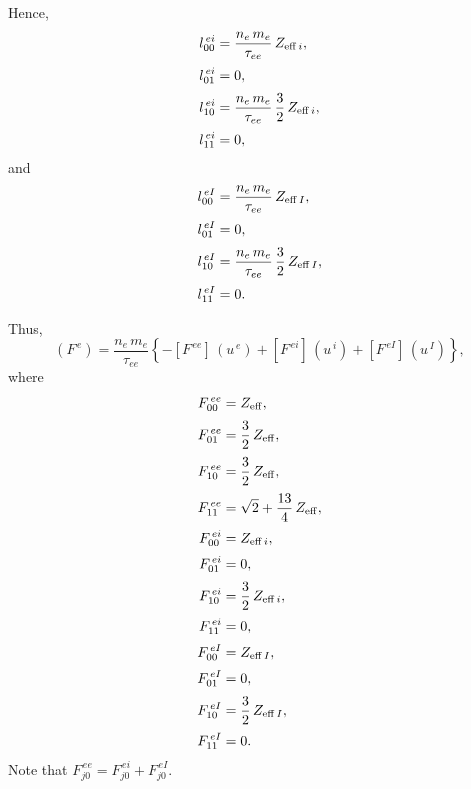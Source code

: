 \documentclass[12pt]{article}
\begin{document}
Hence,
\begin{align}
l^{\,ei}_{00} &= \frac{n_e\,m_e}{\tau_{ee}}\,Z_{{\rm eff}\,i},\\[0.5ex]
l^{\,ei}_{01}&= 0,\\[0.5ex]
l^{\,ei}_{10}&= \frac{n_e\,m_e}{\tau_{ee}}\,\frac{3}{2}\,Z_{{\rm eff}\,i},\\[0.5ex]
l^{\,ei}_{11}& = 0,
\end{align}
and
\begin{align}
l^{\,eI}_{00} &= \frac{n_e\,m_e}{\tau_{ee}}\,Z_{{\rm eff}\,I},\\[0.5ex]
l^{\,eI}_{01}&= 0,\\[0.5ex]
l^{\,eI}_{10}&= \frac{n_e\,m_e}{\tau_{ee}}\,\frac{3}{2}\,Z_{{\rm eff}\,I},\\[0.5ex]
l^{\,eI}_{11}& = 0.
\end{align}

Thus, 
\begin{equation}
(F^{\,e})= \frac{n_e\,m_e}{\tau_{ee}}\left\{-\left[F^{\,ee}\right]\,(u^{\,e})+\left[F^{\,ei}\right]\,(u^{\,i}) +\left[F^{\,eI}\right]\,(u^{\,I}) \right\},
\end{equation}
where
\begin{align}
F^{\,ee}_{00} &= Z_{\rm eff},\\[0.5ex]
F^{\,ee}_{01} &= \frac{3}{2}\,Z_{\rm eff},\\[0.5ex]
F^{\,ee}_{10} &= \frac{3}{2}\,Z_{\rm eff},\\[0.5ex]
F^{\,ee}_{11} &= \sqrt{2} + \frac{13}{4}\,Z_{\rm eff},\\[0.5ex]
F^{\,ei}_{00} &= Z_{{\rm eff}\,i},\\[0.5ex]
F^{\,ei}_{01} &= 0,\\[0.5ex]
F^{\,ei}_{10} &= \frac{3}{2}\,Z_{{\rm eff}\,i},\\[0.5ex]
F^{\,ei}_{11} &= 0,\\[0.5ex]
F^{\,eI}_{00} &= Z_{{\rm eff}\,I},\\[0.5ex]
F^{\,eI}_{01} &= 0,\\[0.5ex]
F^{\,eI}_{10} &= \frac{3}{2}\,Z_{{\rm eff}\,I},\\[0.5ex]
F^{\,eI}_{11} &= 0.
\end{align}
Note that $F^{\,ee}_{j0}= F^{\,ei}_{j0} + F^{\,eI}_{j0}$. 
\end{document}
